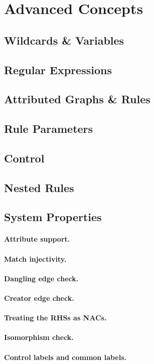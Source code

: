 \section{Advanced Concepts}

\subsection{Wildcards \& Variables}

\subsection{Regular Expressions}

\subsection{Attributed Graphs \& Rules}

\subsection{Rule Parameters}

\subsection{Control}

\subsection{Nested Rules}

\subsection{System Properties}

\paragraph{Attribute support.}

\paragraph{Match injectivity.}

\paragraph{Dangling edge check.}

\paragraph{Creator edge check.}

\paragraph{Treating the RHSs as NACs.}

\paragraph{Isomorphism check.}

\paragraph{Control labels and common labels.}

